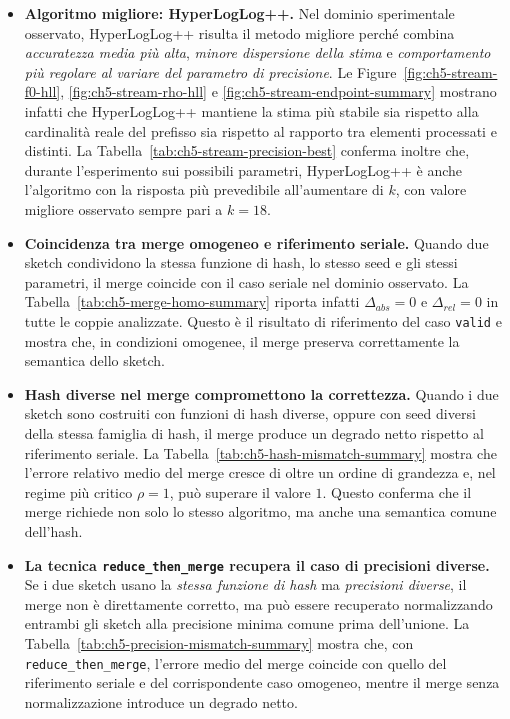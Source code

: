 \begin{itemize}
    \item \textbf{Algoritmo migliore: HyperLogLog++.} Nel dominio sperimentale
    osservato, HyperLogLog++ risulta il metodo migliore perché combina
    \textit{accuratezza media più alta}, \textit{minore dispersione della
    stima} e \textit{comportamento più regolare al variare del parametro di
    precisione}. Le Figure~\ref{fig:ch5-stream-f0-hll},
    \ref{fig:ch5-stream-rho-hll} e
    \ref{fig:ch5-stream-endpoint-summary} mostrano infatti che HyperLogLog++
    mantiene la stima più stabile sia rispetto alla cardinalità reale del
    prefisso sia rispetto al rapporto tra elementi processati e distinti. La
    Tabella~\ref{tab:ch5-stream-precision-best} conferma inoltre che, durante l'esperimento sui possibili parametri,
    HyperLogLog++ è anche l'algoritmo con la risposta più
    prevedibile all'aumentare di \(k\), con valore migliore osservato sempre pari
    a \(k=18\).

    \item \textbf{Coincidenza tra merge omogeneo e riferimento seriale.} Quando
    due sketch condividono la stessa funzione di hash, lo stesso seed e gli
    stessi parametri, il merge coincide con il caso seriale nel dominio
    osservato. La Tabella~\ref{tab:ch5-merge-homo-summary} riporta infatti
    \(\Delta_{abs}=0\) e \(\Delta_{rel}=0\) in tutte le coppie analizzate.
    Questo è il risultato di riferimento del caso \texttt{valid} e mostra che,
    in condizioni omogenee, il merge preserva correttamente la semantica dello
    sketch.

    \item \textbf{Hash diverse nel merge compromettono la correttezza.} Quando
    i due sketch sono costruiti con funzioni di hash diverse, oppure con seed
    diversi della stessa famiglia di hash, il merge produce un degrado
    netto rispetto al riferimento seriale. La
    Tabella~\ref{tab:ch5-hash-mismatch-summary} mostra che l'errore relativo
    medio del merge cresce di oltre un ordine di grandezza e, nel regime più
    critico \(\rho=1\), può superare il valore \(1\). Questo conferma che il
    merge richiede non solo lo stesso algoritmo, ma anche una semantica comune
    dell'hash.

    \item \textbf{La tecnica \texttt{reduce\_then\_merge} recupera il caso di
    precisioni diverse.} Se i due sketch usano la \textit{stessa funzione di
    hash} ma \textit{precisioni diverse}, il merge non è direttamente corretto,
    ma può essere recuperato normalizzando entrambi gli sketch alla precisione
    minima comune prima dell'unione. La
    Tabella~\ref{tab:ch5-precision-mismatch-summary} mostra che, con
    \texttt{reduce\_then\_merge}, l'errore medio del merge coincide con quello
    del riferimento seriale e del corrispondente caso omogeneo, mentre il merge
    senza normalizzazione introduce un degrado netto.
\end{itemize}

